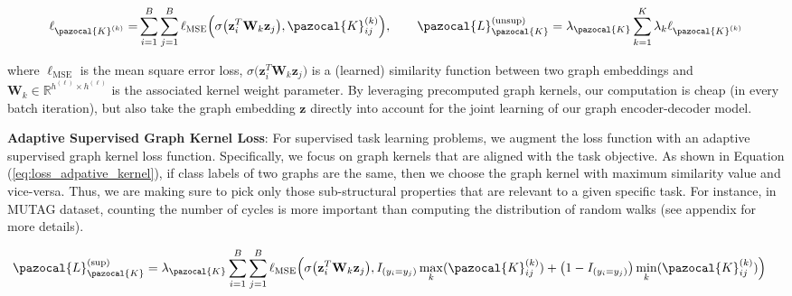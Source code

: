\documentclass{article}
\newcommand{\La}{\pazocal{L}}
\newcommand{\Ka}{\pazocal{K}}
\begin{document}
\vspace{-1.5em}
\begin{equation*}\label{eq:gcnn_op}
\begin{split}
\ell_{\Ka^{(k)}} =&  \sum_{i=1}^{B}\sum_{j=1}^{B}\ell_{\textsc{MSE}}\Big(\sigma\big(\mathbf{z}_i^{T} \mathbf{W}_{k}\mathbf{z}_j \big) , \Ka_{ij}^{(k)} \Big), \hspace{2em}
\La_{\Ka}^{(\text{unsup})} =      \lambda_{\Ka}\sum_{k=1}^{K} \lambda_k \ell_{\Ka^{(k)}} \\ 
\end{split}
\end{equation*}
\vspace{-1.5em}

where $\ell_{\text{MSE}}$ is the mean square error loss, $\sigma\big(\mathbf{z}_i^{T} \mathbf{W}_{k}\mathbf{z}_j \big)$ is a (learned) similarity function between two graph embeddings and  $\mathbf{W}_{k} \in \mathbb{R}^{h^{(\ell)} \times h^{(\ell)}}$ is the associated   kernel weight parameter.  By leveraging precomputed graph kernels, our computation is cheap (in every batch iteration), but also  take the graph embedding  $\mathbf{z}$ directly into account for the joint learning of our graph encoder-decoder model.  




\noindent \textbf{Adaptive Supervised Graph Kernel Loss}:  For supervised task learning problems, we augment the   loss function   with an adaptive supervised graph kernel loss function. Specifically, we focus on graph kernels that are aligned with the task objective. As shown in Equation (\ref{eq:loss_adpative_kernel}), if class labels of two graphs are the same, then we choose the graph kernel with maximum similarity value and vice-versa. Thus, we are making sure to pick only those sub-structural properties that are relevant to a given specific task. For instance, in MUTAG dataset,  counting the number of cycles is more important than computing the  distribution of random walks (see appendix for more details).

\vspace{-1.5em}
\begin{equation}\label{eq:loss_adpative_kernel}
\begin{split}
\La_{\Ka}^{(\text{sup})}  & =  \lambda_{\Ka}\sum_{i=1}^{B}\sum_{j=1}^{B}   
\ell_{\text{MSE}}\Big(\sigma\big(\mathbf{z}_i^{T} \mathbf{W}_{k}\mathbf{z}_j \big),    
I_{(y_i =y_j)}\max_{k}(\Ka_{ij}^{(k)}) +   \big(1-I_{(y_i =y_j)} \big) \min_{k}(\Ka_{ij}^{(k)}) \Big) 
\end{split}
\raisetag{4\normalbaselineskip}
\end{equation}
\end{document}
